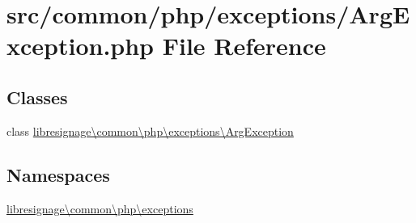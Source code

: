 \hypertarget{ArgException_8php}{}\section{src/common/php/exceptions/\+Arg\+Exception.php File Reference}
\label{ArgException_8php}
\subsection*{Classes}
\begin{DoxyCompactItemize}
\item 
class \hyperlink{classlibresignage_1_1common_1_1php_1_1exceptions_1_1ArgException}{libresignage\textbackslash{}common\textbackslash{}php\textbackslash{}exceptions\textbackslash{}\+Arg\+Exception}
\end{DoxyCompactItemize}
\subsection*{Namespaces}
\begin{DoxyCompactItemize}
\item 
 \hyperlink{namespacelibresignage_1_1common_1_1php_1_1exceptions}{libresignage\textbackslash{}common\textbackslash{}php\textbackslash{}exceptions}
\end{DoxyCompactItemize}
